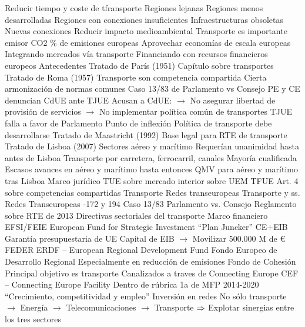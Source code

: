 \documentclass{nuevotema}
\begin{document}
\begin{esquemal}
				\4 Reducir tiempo y coste de tfransporte
				\4[] Regiones lejanas
				\4[] Regiones menos desarrolladas
				\4[] Regiones con conexiones insuficientes
				\4[] Infraestructuras obsoletas
				\4 Nuevas conexiones
			\3 Reducir impacto medioambiental
				\4 Transporte es importante emisor CO2
				\% de emisiones europeas
			\3 Aprovechar economías de escala europeas
				\4 Integrando mercados vía transporte
				\4 Financiando con recursos financieros europeos
		\2 Antecedentes
			\3 Tratado de París (1951)
				\4 Capítulo sobre transportes
			\3 Tratado de Roma (1957)
				\4 Transporte son competencia compartida
				\4 Cierta armonización de normas comunes
			\3 Caso 13/83 de Parlamento vs Consejo
				\4 PE y CE denuncian CdUE ante TJUE
				\4[] Acusan a CdUE:
				\4[] $\to$ No asegurar libertad de provisión de servicios
				\4[] $\to$ No implementar política común de transportes
				\4 TJUE falla a favor de Parlamento
				\4 Punto de inflexión
				\4[] Política de transporte debe desarrollarse
			\3 Tratado de Maastricht (1992)
				\4 Base legal para RTE de transporte
			\3 Tratado de Lisboa (2007)
				\4 Sectores aéreo y marítimo
				\4[] Requerían unanimidad hasta antes de Lisboa
				\4 Transporte por carretera, ferrocarril, canales
				\4[] Mayoría cualificada
				\4[$\then$] Escasos avances en aéreo y marítimo hasta entonces
				\4[$\then$] QMV para aéreo y marítimo tras Lisboa
		\2 Marco jurídico
			\3 TUE
				 sobre mercado interior
				 sobre UEM
			\3 TFUE
				\4 Art. 4 sobre competencias compartidas
				\4[] Transporte
				\4[] Redes transeuropeas
				\4 Transporte
				\4[] 90 y ss.
				\4 Redes Transeuropeas
				-172 y 194
			\3 Caso 13/83 Parlamento vs. Consejo
			\3 Reglamento sobre RTE de 2013
			\3 Directivas sectoriales del transporte
		\2 Marco financiero
			\3 EFSI/FEIE
				\4 European Fund for Strategic Investment
				\4 ``Plan Juncker''
				\4 CE+EIB
				\4[] Garantía presupuestaria de UE
				\4[] Capital de EIB
				\4[] $\to$ Movilizar 500.000 M de €
			\3 FEDER
				\4 ERDF -- European Regional Development Fund
				\4 Fondo Europeo de Desarrollo Regional
				\4 Especialmente en reducción de emisiones
			\3 Fondo de Cohesión
				\4 Principal objetivo es transporte
				\4 Canalizados a traves de Connecting Europe
			\3 CEF -- Connecting Europe Facility
				\4 Dentro de rúbrica 1a de MFP 2014-2020
				\4[] ``Crecimiento, competitividad y empleo''
				\4 Inversión en redes
				\4[] No sólo transporte
				\4[] $\to$ Energía
				\4[] $\to$ Telecomunicaciones
				\4[] $\to$ Transporte
				\4[] $\then$ Explotar sinergias entre los tres sectores

\end{esquemal}
\end{document}
